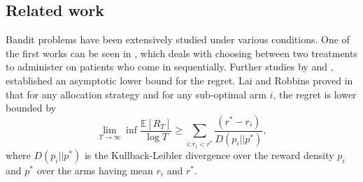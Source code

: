 \subsection*{Related work}
Bandit problems have been extensively studied under various conditions. One of the first works can be seen in \cite{thompson1933likelihood}, which deals with choosing between two treatments to administer on patients who come in sequentially. Further studies by \cite{robbins1952some} and \cite{lai1985asymptotically}, established an asymptotic lower bound for the regret. Lai and Robbins proved in \cite{lai1985asymptotically} that for any allocation strategy and for any sub-optimal arm $i$, the regret is lower bounded by 
$$\lim_{T\rightarrow\infty} \inf\dfrac{\mathbb{E}[R_{T}]}{\log T}\geq
\sum_{i:r_{i}<r^{*}}\dfrac{(r^{*}-r_{i})}{D(p_{i}||p^{*})},$$
where $D(p_{i}||p^{*})$ is the Kullback-Leibler divergence over the reward density $p_{i}$ and $p^{*}$ over the arms having mean $r_{i}$ and $r^{*}$.

